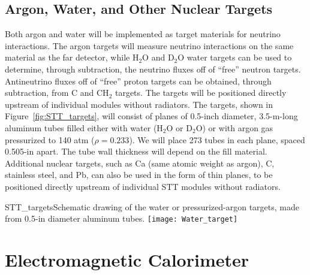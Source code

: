 \subsection{Argon, Water, and Other Nuclear Targets}

Both argon
and water will be implemented as target materials for neutrino interactions.
The argon targets will measure neutrino interactions on the same material as the far detector, while
H$_2$O and D$_2$O water targets can be used to determine, through subtraction, the
neutrino fluxes off of ``free'' neutron targets. Antineutrino fluxes off of ``free''
proton targets can be obtained, through subtraction, from C and CH$_2$ targets.
The targets will be 
positioned directly upstream of individual modules without radiators. 
The targets, shown in 
Figure~\ref{fig:STT_targets}, will consist of planes of 0.5-inch diameter, 3.5-m-long aluminum tubes filled
either with water (H$_2$O or D$_2$O) or with argon gas pressurized to 140 atm ($\rho = 0.233$). 
We will place 273 tubes in each 
plane, spaced 0.505-in apart. The tube wall thickness will depend on the fill material.
Additional nuclear targets, such as Ca (same atomic weight as argon), C, stainless
steel, and Pb, can also be used in
the form of thin planes, to be positioned directly upstream of individual STT modules without radiators.


\begin{cdrfigure}{STT_targets}{Schematic drawing of the water or pressurized-argon targets, 
made from 0.5-in diameter aluminum tubes.}
\texttt{[image: Water\_target]}
\end{cdrfigure}

\section{Electromagnetic Calorimeter}
\label{sec:nd-nnd-emcalo}

